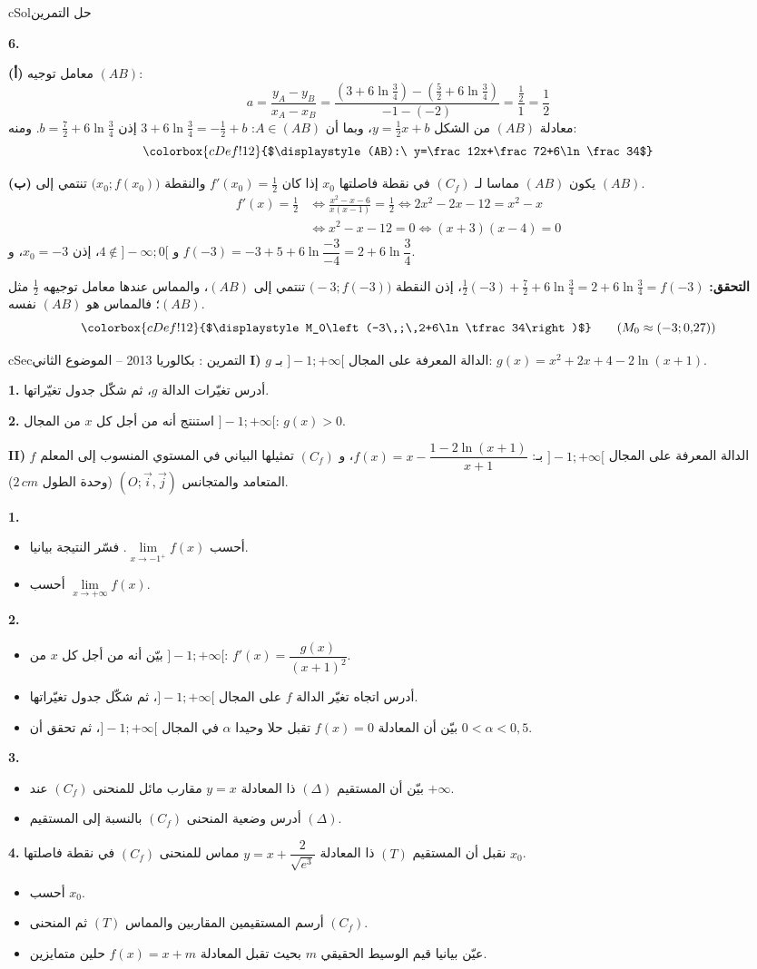 \documentclass[12pt,a4paper]{article}
\newenvironment{BOX}[2]{\begin{otherlanguage}{english}\begin{arbox}{#1}{#2}}{\end{arbox}\end{otherlanguage}}
\newcounter{exo}
\newenvironment{tamrin}[1]{\stepcounter{exo}\begin{BOX}{cSec}{التمرين \theexo: #1}}{\end{BOX}}
\newenvironment{hal}{\Needspace{12\baselineskip}\begin{otherlanguage}{english}\begin{arbox}[breakable]{cSol}{حل التمرين \theexo}}{\end{arbox}\end{otherlanguage}}
\newcommand{\bx}[1]{\ensuremath{\colorbox{cDef!12}{$\displaystyle #1$}}}
\newenvironment{sq}{\begin{itemize}[leftmargin=2.4em,itemsep=3pt]}{\end{itemize}}
\newcommand{\qa}{\item[(أ)]}\newcommand{\qb}{\item[(ب)]}\newcommand{\qc}{\item[(جـ)]}\newcommand{\qd}{\item[(د)]}\newcommand{\qe}{\item[(هـ)]}
\newcommand{\pa}{\par\smallskip\textbf{(أ)} }\newcommand{\pb}{\par\smallskip\textbf{(ب)} }\newcommand{\pc}{\par\smallskip\textbf{(جـ)} }\newcommand{\pd}{\par\smallskip\textbf{(د)} }\newcommand{\pe}{\par\smallskip\textbf{(هـ)} }
\newcommand{\QQ}[1]{\par\smallskip\textbf{#1.} }
\begin{document}
\begin{hal}
\QQ{6}
\pa معامل توجيه $(AB)$:
\[a=\frac{y_A-y_B}{x_A-x_B}=\frac{\left(3+6\ln\frac34\right)-\left(\frac52+6\ln\frac34\right)}{-1-(-2)}=\frac{\frac12}{1}=\frac12\]
معادلة $(AB)$ من الشكل $y=\frac12x+b$، وبما أن $A\in(AB)$: $3+6\ln\frac34=-\frac12+b$ إذن $b=\frac72+6\ln\frac34$. ومنه:
\[\bx{(AB):\ y=\frac12x+\frac72+6\ln\frac34}\]

\pb يكون $(AB)$ مماسا لـ $(C_f)$ في نقطة فاصلتها $x_0$ إذا كان $f'(x_0)=\frac12$ والنقطة $\big(x_0;f(x_0)\big)$ تنتمي إلى $(AB)$.
\begin{align*}
f'(x)=\frac12&\iff \frac{x^2-x-6}{x(x-1)}=\frac12\iff 2x^2-2x-12=x^2-x\\
&\iff x^2-x-12=0\iff (x+3)(x-4)=0
\end{align*}
و $4\notin]-\infty;0[$، إذن $x_0=-3$، و $f(-3)=-3+5+6\ln\dfrac{-3}{-4}=2+6\ln\dfrac34$.

\textbf{التحقق:} $\frac12(-3)+\frac72+6\ln\frac34=2+6\ln\frac34=f(-3)$، إذن النقطة $\big(-3;f(-3)\big)$ تنتمي إلى $(AB)$، والمماس عندها معامل توجيهه $\frac12$ مثل $(AB)$؛ فالمماس هو $(AB)$ نفسه.
\[\bx{M_0\left(-3\,;\,2+6\ln\tfrac34\right)}\qquad(M_0\approx(-3;0{,}27))\]
\end{hal}

\begin{tamrin}{بكالوريا 2013 -- الموضوع الثاني}
\textbf{I)} $g$ الدالة المعرفة على المجال $]-1;+\infty[$ بـ: $g(x)=x^2+2x+4-2\ln(x+1)$.
\QQ{1} أدرس تغيّرات الدالة $g$، ثم شكّل جدول تغيّراتها.
\QQ{2} استنتج أنه من أجل كل $x$ من المجال $]-1;+\infty[$: $g(x)>0$.

\textbf{II)} $f$ الدالة المعرفة على المجال $]-1;+\infty[$ بـ: $f(x)=x-\dfrac{1-2\ln(x+1)}{x+1}$،
و $(C_f)$ تمثيلها البياني في المستوي المنسوب إلى المعلم المتعامد والمتجانس $(O;\vec i,\vec j)$ (وحدة الطول $2\,cm$).
\QQ{1}
\begin{sq}
\qa أحسب $\lim\limits_{x\to -1^{+}}f(x)$. فسّر النتيجة بيانيا.
\qb أحسب $\lim\limits_{x\to +\infty}f(x)$.
\end{sq}
\QQ{2}
\begin{sq}
\qa بيّن أنه من أجل كل $x$ من $]-1;+\infty[$: $f'(x)=\dfrac{g(x)}{(x+1)^2}$.
\qb أدرس اتجاه تغيّر الدالة $f$ على المجال $]-1;+\infty[$، ثم شكّل جدول تغيّراتها.
\qc بيّن أن المعادلة $f(x)=0$ تقبل حلا وحيدا $\alpha$ في المجال $]-1;+\infty[$، ثم تحقق أن $0<\alpha<0{,}5$.
\end{sq}
\QQ{3}
\begin{sq}
\qa بيّن أن المستقيم $(\Delta)$ ذا المعادلة $y=x$ مقارب مائل للمنحنى $(C_f)$ عند $+\infty$.
\qb أدرس وضعية المنحنى $(C_f)$ بالنسبة إلى المستقيم $(\Delta)$.
\end{sq}
\QQ{4} نقبل أن المستقيم $(T)$ ذا المعادلة $y=x+\dfrac{2}{\sqrt{e^3}}$ مماس للمنحنى $(C_f)$ في نقطة فاصلتها $x_0$.
\begin{sq}
\qa أحسب $x_0$.
\qb أرسم المستقيمين المقاربين والمماس $(T)$ ثم المنحنى $(C_f)$.
\qc عيّن بيانيا قيم الوسيط الحقيقي $m$ بحيث تقبل المعادلة $f(x)=x+m$ حلين متمايزين.
\end{sq}
\end{tamrin}
\end{document}
